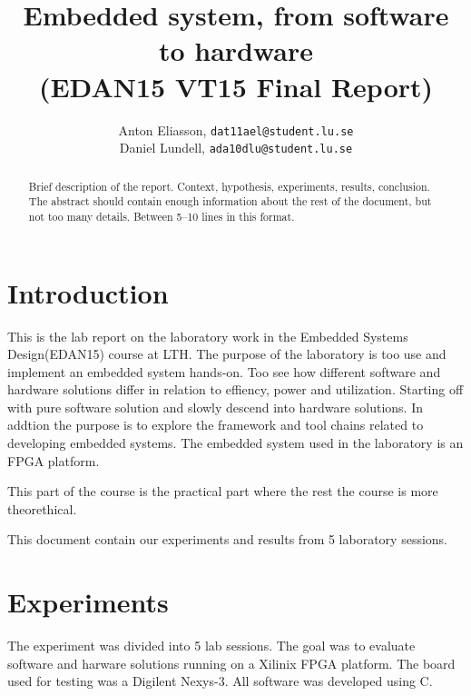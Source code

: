 \documentclass[11pt]{article}
\title{Embedded system, from software to hardware\\\small{(EDAN15 VT15 Final Report)}}
\author{
Anton Eliasson, \texttt{dat11ael@student.lu.se}\\
Daniel Lundell, \texttt{ada10dlu@student.lu.se}
}
\begin{document}
\lstset{
	language=C,
	captionpos=b,
	basicstyle=\footnotesize\ttfamily
}

\maketitle

\begin{abstract}
Brief description of the report. Context, hypothesis, experiments, results, conclusion. The abstract should contain enough
information about the rest of the document, but not too many details. Between 5--10 lines in this format.
\end{abstract}
\section{Introduction}
This is the lab report on the laboratory work in the Embedded Systems Design(EDAN15) course at LTH. The purpose of the laboratory is too use and implement an embedded system hands-on. Too see how different software and hardware solutions differ in relation to effiency, power and utilization. Starting off with pure software solution and slowly descend into hardware solutions. In addtion the purpose is to explore the framework and tool chains related to developing embedded systems. The embedded system used in the laboratory is an FPGA platform.

This part of the course is the practical part where the rest the course is more theorethical.

This document contain our experiments and results from 5 laboratory sessions.



\section{Experiments}\label{sec:exp}
The experiment was divided into 5 lab sessions. The goal was to evaluate software and harware solutions running on a Xilinix FPGA platform. The board used for testing was a Digilent Nexys-3. All software was developed using C.  
\end{document}
